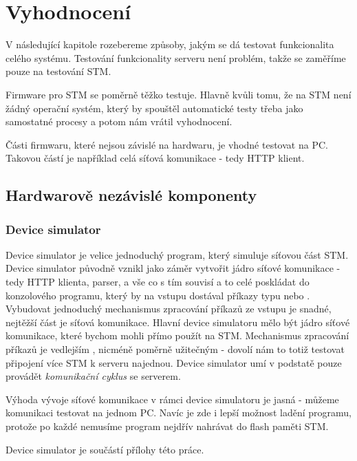 

\chapter{Vyhodnocení}
V následující kapitole rozebereme způsoby, jakým se dá testovat funkcionalita celého systému.
Testování funkcionality serveru není problém, takže se zaměříme pouze na testování STM.

Firmware pro STM se poměrně těžko testuje.
Hlavně kvůli tomu, že na STM není žádný operační systém, který by spouštěl automatické testy třeba jako
samostatné procesy a potom nám vrátil vyhodnocení.


Části firmwaru, které nejsou závislé na hardwaru, je vhodné testovat na PC.
Takovou částí je například celá síťová komunikace - tedy HTTP klient.

\section{Hardwarově nezávislé komponenty}

\subsection{Device simulator}
Device simulator je velice jednoduchý program, který simuluje síťovou část STM.
Device simulator původně vznikl jako záměr vytvořit jádro síťové komunikace - tedy HTTP klienta,
parser, a vše co s tím souvisí a to celé poskládat do konzolového programu, který by na vstupu
dostával příkazy typu  nebo .
Vybudovat jednoduchý mechanismus zpracování příkazů ze vstupu je snadné, nejtěžší část je síťová
komunikace.
Hlavní  device simulatoru mělo být jádro síťové komunikace, které bychom mohli přímo použít
na STM.
Mechanismus zpracování příkazů je vedlejším , nicméně poměrně užitečným - dovolí nám
to totiž testovat připojení více STM k serveru najednou.
Device simulator umí v podstatě pouze provádět \emph{komunikační cyklus} se serverem.

Výhoda vývoje síťové komunikace v rámci device simulatoru je jasná - můžeme komunikaci testovat
na jednom PC.
Navíc je zde i lepší možnost ladění programu, protože po každé nemusíme program nejdřív nahrávat
do flash paměti STM.

Device simulator je součástí přílohy této práce.

